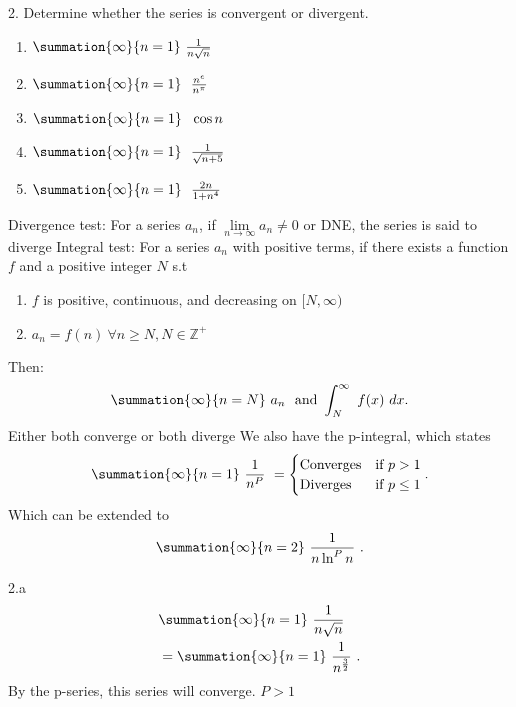 \documentclass{report}
\begin{document}
    \pagebreak \bigbreak \noindent 
    \begin{mdframed}
        2. Determine whether the series is convergent or divergent.
        \begin{enumerate}[label=(\alph*)]
            \item $\summation{\infty}{n=1}\ \frac{1}{n\sqrt{n}}\ $
            \item $\summation{\infty}{n=1}\ \  \frac{n^{e}}{n^{\pi}}$ 
            \item $\summation{\infty}{n=1}\ \ \cos{n} $
            \item $\summation{\infty}{n=1}\ \  \frac{1}{\sqrt{n+5}}$
            \item $\summation{\infty}{n=1}\ \  \frac{2n}{1+n^{4}}$
        \end{enumerate}
    \end{mdframed}
    \bigbreak \noindent 
    \begin{remark}
        Divergence test: For a series $a_{n}$, if $\lim\limits_{n \to \infty}{a_{n}} \ne 0$ or DNE, the series is said to diverge
        \smallbreak \noindent
        Integral test: For a series $a_{n}$ with positive terms, if there exists a function $f$ and a positive integer $N$ s.t
        \begin{enumerate}
            \item $f$ is positive, continuous, and decreasing on $[N, \infty)$
            \item $a_{n}= f(n)\ \forall n \geq N, N \in \mathbb{Z^{+}}$ 
        \end{enumerate}
        Then:
        \begin{align*}
            \summation{\infty}{n=N}\ a_{n}\ \text{ and } \int_{N}^{\infty}\ f(x)\ dx 
        .\end{align*}
        Either both converge or both diverge
        \smallbreak \noindent
        We also have the p-integral, which states
        \begin{align*}
            \summation{\infty}{n=1}\ \frac{1}{n^{P}}\    
                =
                    \begin{cases}
                        \text{Converges} & \text{if } p > 1  \\
                        \text{Diverges} & \text{if }  p \leq 1
                    \end{cases}
        .\end{align*}
    Which can be extended to 
    \begin{align*}
        \summation{\infty}{n=2}\ \frac{1}{n\ln^{P}{n}}\ 
    .\end{align*}
    \end{remark}
    \bigbreak \noindent 
    2.a
    \begin{align*}
        &\summation{\infty}{n=1}\ \frac{1}{n\sqrt{n}}\  \\
        &=\summation{\infty}{n=1}\ \frac{1}{n^{\frac{3}{2}}}\ 
    .\end{align*}
    By the p-series, this series will converge. $P > 1$
\end{document}
